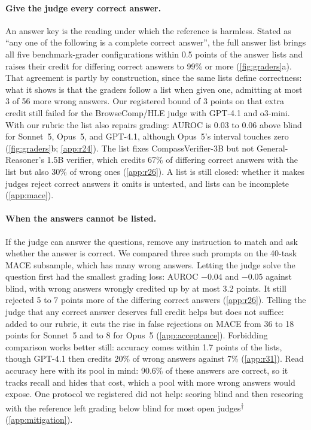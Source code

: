 \documentclass{article}
\newcommand{\ph}{\textsuperscript{$\dagger$}}
\begin{document}
\paragraph{Give the judge every correct answer.}
An answer key is the reading under which the reference is harmless.
Stated as ``any one of the following is a complete correct answer'', the full answer list brings all five benchmark-grader configurations within 0.5 points of the answer lists and raises their credit for differing correct answers to 99\% or more (\cref{fig:graders}a).
That agreement is partly by construction, since the same lists define correctness: what it shows is that the graders follow a list when given one, admitting at most 3 of 56 more wrong answers.
Our registered bound of 3 points on that extra credit still failed for the BrowseComp/HLE judge with GPT-4.1 and o3-mini.
With our rubric the list also repairs grading: AUROC is 0.03 to 0.06 above blind for Sonnet~5, Opus~5, and GPT-4.1, although Opus~5's interval touches zero (\cref{fig:graders}b; \cref{app:r24}).
The list fixes CompassVerifier-3B but not General-Reasoner's 1.5B verifier, which credits 67\% of differing correct answers with the list but also 30\% of wrong ones (\cref{app:r26}).
A list is still closed: whether it makes judges reject correct answers it omits is untested, and lists can be incomplete (\cref{app:mace}).

\paragraph{When the answers cannot be listed.}
If the judge can answer the questions, remove any instruction to match and ask whether the answer is correct.
We compared three such prompts on the 40-task \textsc{MACE} subsample, which has many wrong answers.
Letting the judge solve the question first had the smallest grading loss: AUROC $-0.04$ and $-0.05$ against blind, with wrong answers wrongly credited up by at most 3.2 points.
It still rejected 5 to 7 points more of the differing correct answers (\cref{app:r26}).
Telling the judge that any correct answer deserves full credit helps but does not suffice: added to our rubric, it cuts the rise in false rejections on \textsc{MACE} from 36 to 18 points for Sonnet~5 and to 8 for Opus~5 (\cref{app:acceptance}).
Forbidding comparison works better still: accuracy comes within 1.7 points of the lists, though GPT-4.1 then credits 20\% of wrong answers against 7\% (\cref{app:r31}). Read accuracy here with its pool in mind: 90.6\% of these answers are correct, so it tracks recall and hides that cost, which a pool with more wrong answers would expose.
One protocol we registered did not help: scoring blind and then rescoring with the reference left grading below blind for most open judges\ph{} (\cref{app:mitigation}).
\end{document}
